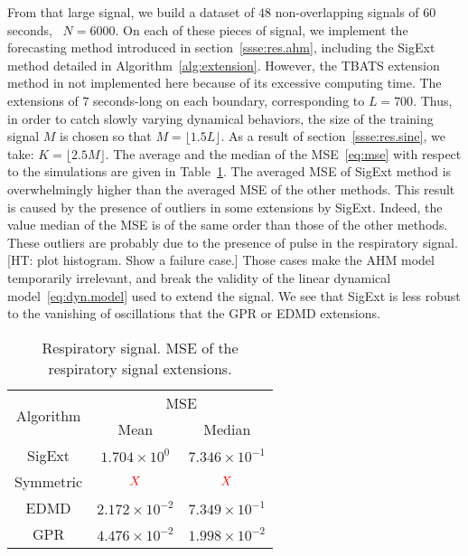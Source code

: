 From that large signal, we build a dataset of $48$ non-overlapping signals of 60 seconds, \ie~$N=6000$. On each of these pieces of signal, we implement the forecasting method introduced in section~\ref{ssse:res.ahm}, including the {\sf SigExt} method detailed in Algorithm~\ref{alg:extension}. However, the TBATS extension method in not implemented here because of its excessive computing time. The extensions of $7$ seconds-long on each boundary, corresponding to $L =700$. Thus, in order to catch slowly varying dynamical behaviors, the size of the training signal $M$ is chosen so that $M=\lfloor 1.5L\rfloor$. As a result of section~\ref{ssse:res.sine}, we take: $K=\lfloor2.5M\rfloor$. The average and the median of the MSE~\eqref{eq:mse} with respect to the simulations are given in Table~\ref{tab:mse}. The averaged MSE of {\sf SigExt} method is overwhelmingly higher than the averaged MSE of the other methods. This result is caused by the presence of outliers in some extensions by {\sf SigExt}. Indeed, the value median of the MSE is of the same order than those of the other methods. These outliers are probably due to the presence of pulse in the respiratory signal. {\color{red}[HT: plot histogram. Show a failure case.]} Those cases make the AHM model temporarily irrelevant, and break the validity of the linear dynamical model~\eqref{eq:dyn.model} used to extend the signal. We see that {\sf SigExt} is less robust to the vanishing of oscillations that the GPR or EDMD extensions.

\begin{table}
\centering
\caption{Respiratory signal. MSE of the respiratory signal extensions.}
\begin{tabular}{|c||c|c|}
  \hline
   \multirow{2}{*}{Algorithm} & \multicolumn{2}{c|}{MSE} \\
   \cline{2-3}
      & Mean & Median\\
   \hhline{|=#=|=|}
   {\sf SigExt} & $1.704 \times 10^{0}$ & $7.346 \times 10^{-1}$ \\
   \hline
   Symmetric & ${\color{red}X}$ & ${\color{red}X}$ \\
   \hline
   EDMD & $2.172\times 10^{-2}$ & $7.349\times 10^{-1}$ \\
   \hline
   GPR & $4.476\times 10^{-2}$ & $1.998\times 10^{-2}$ \\
   \hline
\end{tabular}
\label{tab:mse}
\end{table} 


